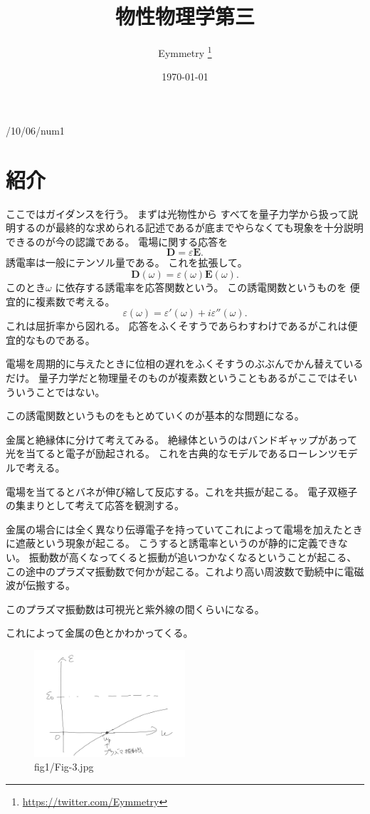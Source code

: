 \documentclass[dvipdfmx,12pt]{jsarticle}
\title{物性物理学第三}
\author{Eymmetry \thanks{\url{https://twitter.com/Eymmetry}}}
\date{\today}
\begin{document}
\maketitle

/10/06/num1
\section{紹介}
ここではガイダンスを行う。
まずは光物性から
すべてを量子力学から扱って説明するのが最終的な求められる記述であるが底までやらなくても現象を十分説明できるのが今の認識である。
電場に関する応答を
\[
\bm{D}=\varepsilon \bm{E}
.\] 
誘電率は一般にテンソル量である。
これを拡張して。
\[
\bm{D}(\omega)=\varepsilon(\omega)\bm{E}(\omega)
.\] 
このとき$\omega$ に依存する誘電率を応答関数という。
この誘電関数というものを
便宜的に複素数で考える。
\[
\varepsilon(\omega)=\varepsilon'(\omega)+i\varepsilon''(\omega)
.\] 
これは屈折率から図れる。
応答をふくそすうであらわすわけであるがこれは便宜的なものである。

電場を周期的に与えたときに位相の遅れをふくそすうのぶぶんでかん替えているだけ。
量子力学だと物理量そのものが複素数ということもあるがここではそいういうことではない。

この誘電関数というものをもとめていくのが基本的な問題になる。

金属と絶縁体に分けて考えてみる。
絶縁体というのはバンドギャップがあって光を当てると電子が励起される。
これを古典的なモデルであるローレンツモデルで考える。

電場を当てるとバネが伸び縮して反応する。これを共振が起こる。
電子双極子の集まりとして考えて応答を観測する。

金属の場合には全く異なり伝導電子を持っていてこれによって電場を加えたときに遮蔽という現象が起こる。
こうすると誘電率というのが静的に定義できない。
振動数が高くなってくると振動が追いつかなくなるということが起こる、この途中のプラズマ振動数で何かが起こる。これより高い周波数で勤続中に電磁波が伝搬する。

このプラズマ振動数は可視光と紫外線の間くらいになる。

これによって金属の色とかわかってくる。
\begin{figure}[H]
	\centering
	\includegraphics[width=0.5\textwidth]{fig1/Fig-3.jpg}
	\caption{fig1/Fig-3.jpg}
	\label{fig:fig1-Fig-3-jpg}
\end{figure}
\end{document}
